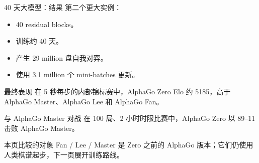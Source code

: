 \documentclass[UTF8,aspectratio=169,10pt]{ctexbeamer}
\begin{document}
\begin{frame}{40 天大模型：结果}
  \footnotesize
  第二个更大实例：

  \begin{itemize}
    \item 40 residual blocks。
    \item 训练约 40 天。
    \item 产生 29 million 盘自我对弈。
    \item 使用 3.1 million 个 mini-batches 更新。
  \end{itemize}

  \begin{block}{最终表现}
    在 5 秒每步的内部锦标赛中，AlphaGo Zero Elo 约 5185，高于 AlphaGo Master、AlphaGo Lee 和 AlphaGo Fan。
  \end{block}

  \begin{alertblock}{与 AlphaGo Master 对战}
    在 100 局、2 小时时限比赛中，AlphaGo Zero 以 89--11 击败 AlphaGo Master。
  \end{alertblock}

  \begin{block}{本页比较的对象}
    Fan / Lee / Master 是 Zero 之前的 AlphaGo 版本；它们仍使用人类棋谱起步，下一页展开训练路线。
  \end{block}
\end{frame}
\end{document}
